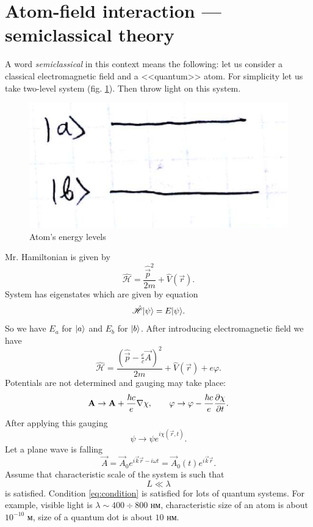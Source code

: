 \section{Atom-field interaction --- semiclassical theory}
\label{sec:atom-field_interaction}

A word \textit{semiclassical} in this context means the following: let us consider a classical electromagnetic field and a <<quantum>> atom. For simplicity let us take two-level system (fig. \ref{fig:2lvl}). Then throw light on this system.
\begin{figure}[h!]
	\centering
	\includegraphics[width=0.4\linewidth]{fig/L4/2lvl}
	\caption{Atom's energy levels }
	\label{fig:2lvl}
\end{figure}

Mr. Hamiltonian is given by
\begin{equation}
	\hat{\mathscr{H}} = \frac{\hat{\vec{p}}^2}{2 m} + \hat{V} (\vec{r}).
\end{equation}
System has eigenstates which are given by equation
\begin{equation}
	\hat{\mathscr{H}} \lvert\psi\rangle = E \lvert\psi\rangle.
\end{equation}
So we have $E_a$ for $\lvert a\rangle$ and $E_b$ for $\lvert b\rangle$. After introducing electromagnetic field we have
\begin{equation}
	\hat{\mathscr{H}} = \frac{(\hat{\vec{p}} - \frac{e}{c} \vec{A})^2}{2m} + \hat{V}(\vec{r}) + e \varphi.
\end{equation}
Potentials are not determined and gauging may take place:
\begin{equation}
	\mathbf{A} \to \mathbf{A} + \frac{\hbar c}{e} \nabla \chi, \qquad \varphi \to \varphi - \frac{\hbar c}{e} \dfrac{\partial {\chi}}{\partial {t}}.
\end{equation}
After applying this gauging 
\begin{equation}
	\psi \to \psi e^{i \chi(\vec{r},t)}.
\end{equation}
Let a plane wave is falling 
\begin{equation}
	\vec{A} = \vec{A}_0 e^{i \vec{k}\vec{r} - i \omega t} = \vec{A}_0(t) e^{i \vec{k}\vec{r}}.
\end{equation}
Assume that characteristic scale of the system is such that 
\begin{equation}
	L \ll \lambda
	\label{eq:condition}
\end{equation}
is satisfied. Condition \eqref{eq:condition} is satisfied for lots of quantum systems. 
For example, visible light is $\lambda \sim 400 \div 800 \text{ нм}$, 
characteristic size of an atom is about $10^{-10} \text{ м}$, size of a quantum dot is about $10 \text{ нм}$. 

